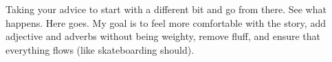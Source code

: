 Taking your advice to start with a different bit and go from there. See what happens. Here goes. My goal is to feel more comfortable with the story, add adjective and adverbs without being weighty, remove fluff, and ensure that everything flows (like skateboarding should).
